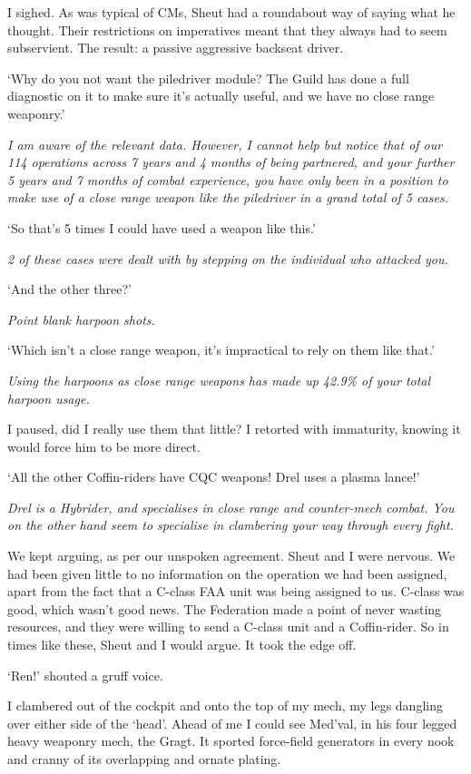 I sighed. As was typical of CMs, Sheut had a roundabout way of saying what he thought. Their restrictions on imperatives meant that they always had to seem subservient. The result: a passive aggressive backseat driver.

`Why do you not want the piledriver module? The Guild has done a full diagnostic on it to make sure it's actually useful, and we have no close range weaponry.'

{\it I am aware of the relevant data. However, I cannot help but notice that of our 114 operations across 7 years and 4 months of being partnered, and your further 5 years and 7 months of combat experience, you have only been in a position to make use of a close range weapon like the piledriver in a grand total of 5 cases.}

`So that's 5 times I could have used a weapon like this.'

{\it 2 of these cases were dealt with by stepping on the individual who attacked you.}

`And the other three?'

{\it Point blank harpoon shots.}

`Which isn't a close range weapon, it's impractical to rely on them like that.'

{\it Using the harpoons as close range weapons has made up 42.9\% of your total harpoon usage.}

I paused, did I really use them that little? I retorted with immaturity, knowing it would force him to be more direct.

`All the other Coffin-riders have CQC weapons! Drel uses a plasma lance!'

{\it Drel is a Hybrider, and specialises in close range and counter-mech combat. You on the other hand seem to specialise in clambering your way through every fight.}

We kept arguing, as per our unspoken agreement. Sheut and I were nervous. We had been given little to no information on the operation we had been assigned, apart from the fact that a C-class FAA unit was being assigned to us. C-class was good, which wasn't good news. The Federation made a point of never wasting resources, and they were willing to send a C-class unit and a Coffin-rider. So in times like these, Sheut and I would argue. It took the edge off.

`Ren!' shouted a gruff voice.

I clambered out of the cockpit and onto the top of my mech, my legs dangling over either side of the `head'. Ahead of me I could see Med'val, in his four legged heavy weaponry mech, the Gragt. It sported force-field generators in every nook and cranny of its overlapping and ornate plating.

